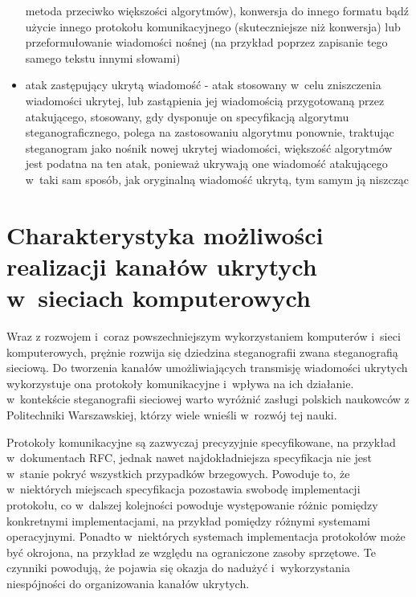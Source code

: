 \documentclass[a4paper, twoside, 12pt]{report}
\begin{document}
\begin{itemize}
                metoda przeciwko większości algorytmów), konwersja do innego formatu
                bądź użycie innego protokołu komunikacyjnego (skuteczniejsze niż konwersja) lub
                przeformułowanie wiadomości nośnej (na przykład poprzez zapisanie tego samego tekstu
                innymi słowami)
            \item atak zastępujący ukrytą wiadomość - atak stosowany w~celu zniszczenia
                wiadomości ukrytej, lub zastąpienia jej wiadomością przygotowaną przez atakującego,
                stosowany, gdy dysponuje on specyfikacją algorytmu steganograficznego,
                polega na zastosowaniu algorytmu ponownie, traktując steganogram jako nośnik
                nowej ukrytej wiadomości, większość algorytmów jest podatna na ten
                atak, ponieważ ukrywają one wiadomość atakującego w~taki sam sposób,
                jak oryginalną wiadomość ukrytą, tym samym ją niszcząc
        \end{itemize}


\chapter{Charakterystyka możliwości realizacji kanałów ukrytych w~sieciach komputerowych}
    Wraz z rozwojem i~coraz powszechniejszym wykorzystaniem komputerów i~sieci
    komputerowych, prężnie rozwija się dziedzina steganografii zwana steganografią
    sieciową. Do tworzenia kanałów umożliwiających transmisję wiadomości ukrytych
    wykorzystuje ona protokoły komunikacyjne i~wpływa na ich działanie. w~kontekście
    steganografii sieciowej warto wyróżnić zasługi polskich naukowców z Politechniki
    Warszawskiej, którzy wiele wnieśli w~rozwój tej nauki\cite{STEGANOGRAFIASIECIOWAART}.

    Protokoły komunikacyjne są zazwyczaj
    precyzyjnie specyfikowane, na przykład w~dokumentach RFC, jednak nawet najdokładniejsza
    specyfikacja nie jest w~stanie pokryć wszystkich przypadków brzegowych. Powoduje
    to, że w~niektórych miejscach specyfikacja pozostawia swobodę implementacji protokołu,
    co w~dalszej kolejności powoduje występowanie różnic pomiędzy konkretnymi
    implementacjami, na przykład pomiędzy różnymi systemami operacyjnymi. Ponadto
    w~niektórych systemach implementacja protokołów może być okrojona, na przykład
    ze względu na ograniczone zasoby sprzętowe. Te czynniki
    powodują, że pojawia się okazja do nadużyć i~wykorzystania niespójności do organizowania
    kanałów ukrytych.
\end{document}
